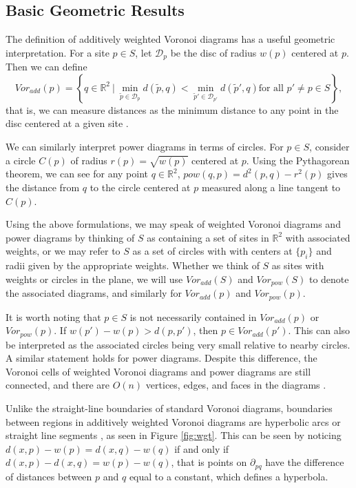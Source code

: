 \documentclass[a4paper, 11pt]{article}
\newcommand{\R}{\mathbb{R}}
\begin{document}
\subsection{Basic Geometric Results}
\label{sec:basic_geom}

The definition of additively weighted Voronoi diagrams has a useful geometric interpretation. For a site $p \in S$, let $\mathcal{D}_p$ be the disc of radius $w(p)$ centered at $p$. Then we
can define
\begin{equation*}
  Vor_{add}(p) = \left\{ q \in \R^2 \ | \ \min_{\tilde{p} \in \mathcal{D}_p} d(\tilde{p}, q) < \min_{\tilde{p}' \in \mathcal{D}_{p'}} d(\tilde{p}', q) \text{
  for all } p' \neq p \in S \right\},
\end{equation*}
that is, we can measure distances as the minimum distance to any point in the disc centered at a given site \cite{rosenberger_additive}.

We can similarly interpret power diagrams in terms of circles. For $p \in S$, consider a circle $C(p)$ of radius $r(p) = \sqrt{w(p)}$ centered at $p$. Using the
Pythagorean theorem, we can see for any point $q \in \R^2$, $pow(q,p) = d^2(p,q) - r^2(p)$ gives the distance from $q$ to the circle centered at $p$
measured along a line tangent to $C(p)$.

Using the above formulations, we may speak of weighted Voronoi diagrams and power diagrams by thinking of $S$ as
containing a set of sites in $\R^2$ with associated weights, or we may refer to $S$ as a set of circles with with centers at $\{p_i\}$ and radii given by the appropriate weights.
Whether we think of $S$ as sites with weights or circles in the plane, we will use $Vor_{add}(S)$ and $Vor_{pow}(S)$ to denote the
associated diagrams, and similarly for $Vor_{add}(p)$ and $Vor_{pow}(p)$.

It is worth noting that $p \in S$ is not necessarily contained in $Vor_{add}(p)$ or $Vor_{pow}(p)$. If $w(p') - w(p) > d(p,p')$, then $p \in
Vor_{add}(p')$. This can also be interpreted as the associated circles being very small relative to nearby circles. A similar statement holds for power diagrams.
Despite this difference, the Voronoi cells of weighted Voronoi diagrams and power diagrams are still connected, and there are $O(n)$ vertices, edges,
and faces in the diagrams \cite{aurenhammer_power} \cite{rosenberger_additive}.

Unlike the straight-line boundaries of standard
Voronoi diagrams, boundaries between regions in additively weighted Voronoi diagrams are hyperbolic arcs or straight line segments
\cite{aurenhammer_additive}, as seen in Figure \ref{fig:wgt}. This can be seen by noticing $d(x,p) - w(p) = d(x,q) - w(q)$ if and only if $d(x,p) - d(x,q) = w(p) - w(q)$, that is
points on $\partial_{pq}$ have the difference of distances between $p$ and $q$ equal to a constant, which defines a hyperbola.
\end{document}
